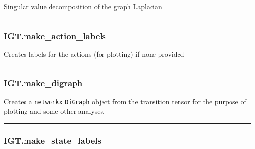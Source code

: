 \begin{Shaded}
\begin{Highlighting}[]
\NormalTok{)}
\end{Highlighting}
\end{Shaded}

Singular value decomposition of the graph Laplacian

\begin{center}\rule{0.5\linewidth}{\linethickness}\end{center}

\subsubsection{IGT.make\_action\_labels}\label{igt.make_action_labels}

\begin{Shaded}
\begin{Highlighting}[]
\NormalTok{)}
\end{Highlighting}
\end{Shaded}

Creates labels for the actions (for plotting) if none provided

\begin{center}\rule{0.5\linewidth}{\linethickness}\end{center}

\subsubsection{IGT.make\_digraph}\label{igt.make_digraph}

\begin{Shaded}
\begin{Highlighting}[]
\NormalTok{)}
\end{Highlighting}
\end{Shaded}

Creates a \texttt{networkx} \texttt{DiGraph} object from the transition
tensor for the purpose of plotting and some other analyses.

\begin{center}\rule{0.5\linewidth}{\linethickness}\end{center}

\subsubsection{IGT.make\_state\_labels}\label{igt.make_state_labels}


